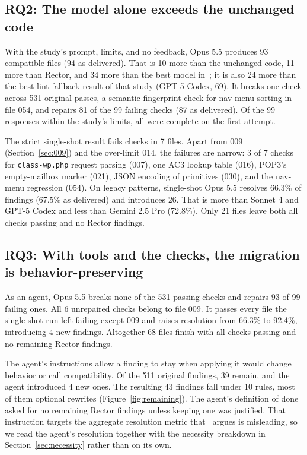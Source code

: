 \documentclass[11pt]{article}
\newcommand{\code}[1]{\texttt{#1}}
\begin{document}
\subsection{RQ2: The model alone exceeds the unchanged code}

With the study's prompt, limits, and no feedback, Opus 5.5 produces 93 compatible files (94 as delivered).
That is 10 more than the unchanged code, 11 more than Rector, and 34 more than the best model in~\cite{mahmud2026modernization}; it is also 24 more than the best lint-fallback result of that study (GPT-5 Codex, 69).
It breaks one check across 531 original passes, a semantic-fingerprint check for nav-menu sorting in file 054, and repairs 81 of the 99 failing checks (87 as delivered).
Of the 99 responses within the study's limits, all were complete on the first attempt.

The strict single-shot result fails checks in 7 files.
Apart from 009 (Section~\ref{sec:009}) and the over-limit 014, the failures are narrow: 3 of 7 checks for \code{class-wp.php} request parsing (007), one AC3 lookup table (016), POP3's empty-mailbox marker (021), JSON encoding of primitives (030), and the nav-menu regression (054).
On legacy patterns, single-shot Opus 5.5 resolves 66.3\% of findings (67.5\% as delivered) and introduces 26.
That is more than Sonnet 4 and GPT-5 Codex and less than Gemini 2.5 Pro (72.8\%).
Only 21 files leave both all checks passing and no Rector findings.

\subsection{RQ3: With tools and the checks, the migration is behavior-preserving}
\label{sec:rq3}

As an agent, Opus 5.5 breaks none of the 531 passing checks and repairs 93 of 99 failing ones.
All 6 unrepaired checks belong to file 009.
It passes every file the single-shot run left failing except 009 and raises resolution from 66.3\% to 92.4\%, introducing 4 new findings.
Altogether 68 files finish with all checks passing and no remaining Rector findings.

The agent's instructions allow a finding to stay when applying it would change behavior or call compatibility.
Of the 511 original findings, 39 remain, and the agent introduced 4 new ones.
The resulting 43 findings fall under 10 rules, most of them optional rewrites (Figure~\ref{fig:remaining}).
The agent's definition of done asked for no remaining Rector findings unless keeping one was justified.
That instruction targets the aggregate resolution metric that~\cite{mahmud2026modernization} argues is misleading, so we read the agent's resolution together with the necessity breakdown in Section~\ref{sec:necessity} rather than on its own.
\end{document}
